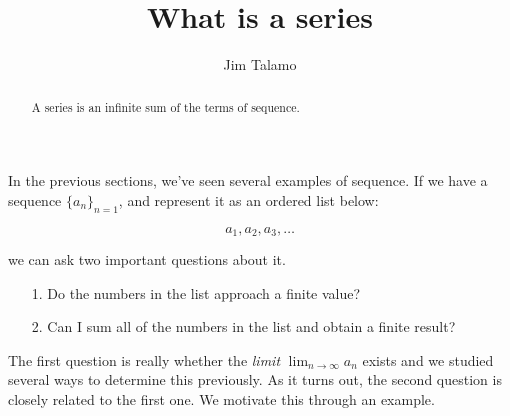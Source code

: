 \documentclass{ximera}
\author{Jim Talamo}
\title[Dig-In:]{What is a series}
\begin{document}
\begin{abstract}
A series is an infinite sum of the terms of sequence.
\end{abstract}
\maketitle

In the previous sections, we've seen several examples of sequence.  If we have a sequence $\{a_n\}_{n=1}$, and represent it as an ordered list below: 

\[
a_1, a_2, a_3 , \ldots
\]

we can ask two important questions about it.

\begin{itemize}
\item[1.] Do the numbers in the list approach a finite value?
\item[2.] Can I sum all of the numbers in the list and obtain a finite result?
\end{itemize}

The first question is really whether the \emph{limit} $\lim_{n \to \infty} a_n$ exists and we studied several ways to determine this previously.  As it turns out, the second question is closely related to the first one.  We motivate this through an example.
\end{document}
